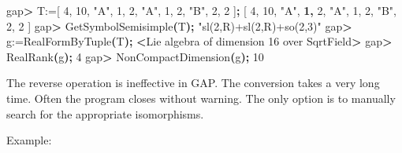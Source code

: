\documentclass[
]{article}
\newenvironment{Shaded}{\begin{snugshade}}{\end{snugshade}}
\newcommand{\BuiltInTok}[1]{#1}
\newcommand{\ErrorTok}[1]{\textcolor[rgb]{0.64,0.00,0.00}{\textbf{#1}}}
\newcommand{\ExtensionTok}[1]{#1}
\newcommand{\KeywordTok}[1]{\textcolor[rgb]{0.13,0.29,0.53}{\textbf{#1}}}
\newcommand{\NormalTok}[1]{#1}
\newcommand{\OperatorTok}[1]{\textcolor[rgb]{0.81,0.36,0.00}{\textbf{#1}}}
\newcommand{\StringTok}[1]{\textcolor[rgb]{0.31,0.60,0.02}{#1}}
\begin{document}
\begin{Shaded}
\begin{Highlighting}[]
\ExtensionTok{gap}\OperatorTok{\textgreater{}}\NormalTok{ T:=[ 4, 10, }\StringTok{"A"}\NormalTok{, 1, 2, }\StringTok{"A"}\NormalTok{, 1, 2, }\StringTok{"B"}\NormalTok{, 2, 2 ]}\KeywordTok{;}
\BuiltInTok{[}\NormalTok{ 4, 10, }\StringTok{"A"}\NormalTok{, }\ErrorTok{1,}\NormalTok{ 2, }\StringTok{"A"}\NormalTok{, 1, 2, }\StringTok{"B"}\NormalTok{, 2, 2 ]}
\ExtensionTok{gap}\OperatorTok{\textgreater{}}\NormalTok{ GetSymbolSemisimple}\ErrorTok{(}\ExtensionTok{T}\KeywordTok{);}
\StringTok{"sl(2,R)+sl(2,R)+so(2,3)"}
\ExtensionTok{gap}\OperatorTok{\textgreater{}}\NormalTok{ g:=RealFormByTuple}\ErrorTok{(}\ExtensionTok{T}\KeywordTok{);}
\OperatorTok{\textless{}}\NormalTok{Lie }\ExtensionTok{algebra}\NormalTok{ of dimension 16 over SqrtField}\OperatorTok{\textgreater{}}
\ExtensionTok{gap}\OperatorTok{\textgreater{}}\NormalTok{ RealRank}\ErrorTok{(}\ExtensionTok{g}\KeywordTok{);}
\ExtensionTok{4}
\ExtensionTok{gap}\OperatorTok{\textgreater{}}\NormalTok{ NonCompactDimension}\ErrorTok{(}\ExtensionTok{g}\KeywordTok{);}
\ExtensionTok{10}
\end{Highlighting}
\end{Shaded}

The reverse operation is ineffective in GAP. The conversion takes a very
long time. Often the program closes without warning. The only option is
to manually search for the appropriate isomorphisms.

Example:
\end{document}
